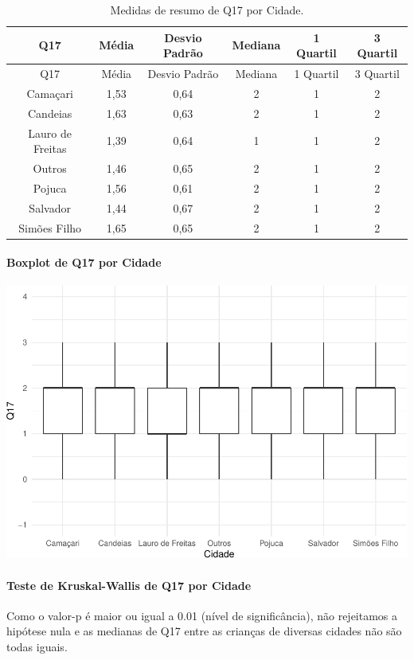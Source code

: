 \documentclass[]{article}
\let\oldparagraph\paragraph
\renewcommand{\paragraph}[1]{\oldparagraph{#1}\mbox{}}
\begin{document}
\begin{longtable}[]{@{}cccccc@{}}
\caption{\label{tab:unnamed-chunk-193}Medidas de resumo de Q17 por Cidade.}\tabularnewline
\toprule
Q17 & Média & Desvio Padrão & Mediana & 1 Quartil & 3 Quartil\tabularnewline
\midrule
\endfirsthead
\toprule
Q17 & Média & Desvio Padrão & Mediana & 1 Quartil & 3 Quartil\tabularnewline
\midrule
\endhead
Camaçari & 1,53 & 0,64 & 2 & 1 & 2\tabularnewline
Candeias & 1,63 & 0,63 & 2 & 1 & 2\tabularnewline
Lauro de Freitas & 1,39 & 0,64 & 1 & 1 & 2\tabularnewline
Outros & 1,46 & 0,65 & 2 & 1 & 2\tabularnewline
Pojuca & 1,56 & 0,61 & 2 & 1 & 2\tabularnewline
Salvador & 1,44 & 0,67 & 2 & 1 & 2\tabularnewline
Simões Filho & 1,65 & 0,65 & 2 & 1 & 2\tabularnewline
\bottomrule
\end{longtable}

\hypertarget{boxplot-de-q17-por-cidade}{%
\paragraph{Boxplot de Q17 por Cidade}\label{boxplot-de-q17-por-cidade}}

\begin{center}\includegraphics[width=0.75\linewidth]{relatorio_covid19_files/figure-latex/unnamed-chunk-194-1} \end{center}

\hypertarget{teste-de-kruskal-wallis-de-q17-por-cidade}{%
\paragraph{Teste de Kruskal-Wallis de Q17 por Cidade}\label{teste-de-kruskal-wallis-de-q17-por-cidade}}

Como o valor-p é maior ou igual a 0.01 (nível de significância), não rejeitamos a hipótese nula e as medianas de Q17 entre as crianças de diversas cidades não são todas iguais.
\end{document}
